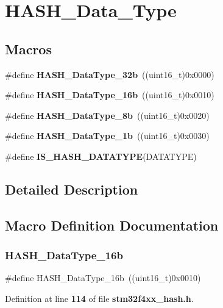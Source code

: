 \section{H\+A\+S\+H\+\_\+\+Data\+\_\+\+Type}
\label{group__HASH__Data__Type}
\subsection*{Macros}
\begin{DoxyCompactItemize}
\item 
\#define \textbf{ H\+A\+S\+H\+\_\+\+Data\+Type\+\_\+32b}~((uint16\+\_\+t)0x0000)
\item 
\#define \textbf{ H\+A\+S\+H\+\_\+\+Data\+Type\+\_\+16b}~((uint16\+\_\+t)0x0010)
\item 
\#define \textbf{ H\+A\+S\+H\+\_\+\+Data\+Type\+\_\+8b}~((uint16\+\_\+t)0x0020)
\item 
\#define \textbf{ H\+A\+S\+H\+\_\+\+Data\+Type\+\_\+1b}~((uint16\+\_\+t)0x0030)
\item 
\#define \textbf{ I\+S\+\_\+\+H\+A\+S\+H\+\_\+\+D\+A\+T\+A\+T\+Y\+PE}(D\+A\+T\+A\+T\+Y\+PE)
\end{DoxyCompactItemize}


\subsection{Detailed Description}


\subsection{Macro Definition Documentation}
\mbox{\label{group__HASH__Data__Type_ga07a0a06c7076fab096f1cc4ae66bcad8}} 
\subsubsection{H\+A\+S\+H\+\_\+\+Data\+Type\+\_\+16b}
{\footnotesize\ttfamily \#define H\+A\+S\+H\+\_\+\+Data\+Type\+\_\+16b~((uint16\+\_\+t)0x0010)}



Definition at line \textbf{ 114} of file \textbf{ stm32f4xx\+\_\+hash.\+h}.

